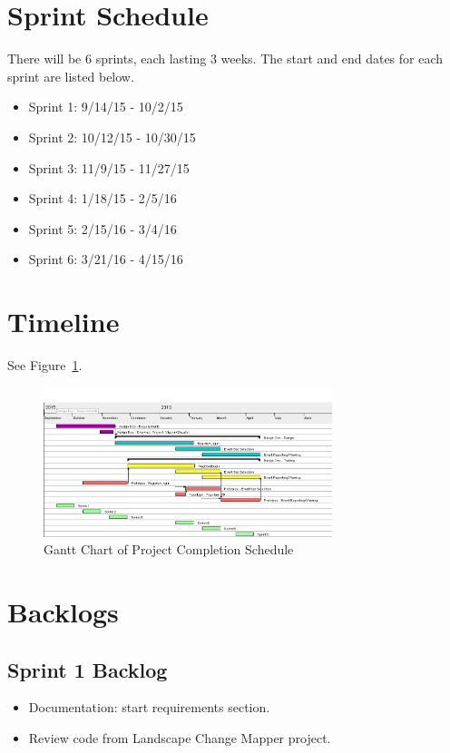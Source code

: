 \section{Sprint Schedule}
There will be 6 sprints, each lasting 3 weeks. The start and end dates for each sprint are listed below.
\begin{itemize}
\itemsep0em
\item Sprint 1: 9/14/15 - 10/2/15
\item Sprint 2: 10/12/15 - 10/30/15
\item Sprint 3: 11/9/15 - 11/27/15
\item Sprint 4: 1/18/15 - 2/5/16
\item Sprint 5: 2/15/16 - 3/4/16
\item Sprint 6: 3/21/16 - 4/15/16
\end{itemize}

\section{Timeline}
See Figure~\ref{projectgantt}.

\begin{figure}[tbh]
\begin{center}
\includegraphics[width=0.75\textwidth]{./figures/projectgantt.png}
\end{center}
\caption{Gantt Chart of Project Completion Schedule\label{projectgantt}}
\end{figure}

\section{Backlogs}

\subsection{Sprint 1 Backlog}
\begin{itemize}
\itemsep0em
\item Documentation: start requirements section.
\item Review code from Landscape Change Mapper project.
\end{itemize}

